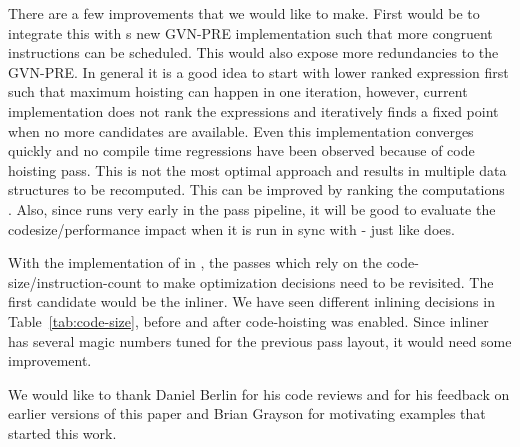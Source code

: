 \documentclass[acmlarge,review,anonymous]{acmart}\settopmatter{printfolios=true}
\begin{document}
There are a few improvements that we would like to make. First would be to
integrate this with s new GVN-PRE implementation such that more
congruent instructions can be scheduled. This would also expose more
redundancies to the GVN-PRE.  In general it is a good idea to start with lower
ranked expression first such that maximum hoisting can happen in one iteration,
however, current implementation does not rank the expressions and iteratively
finds a fixed point when no more candidates are available. Even this
implementation converges quickly and no compile time regressions have been
observed because of code hoisting pass. This is not the most optimal approach
and results in multiple data structures to be recomputed. This can be improved
by ranking the computations \cite{rosen1988global}. Also, since \GCM{} runs very
early in the pass pipeline, it will be good to evaluate the codesize/performance
impact when it is run in sync with \GVN{}-\PRE{} just like \GCC{} does.

With the implementation of \GCM{} in \LLVM{}, the passes which rely on the
code-size/instruction-count to make optimization decisions need to be
revisited. The first candidate would be the inliner. We have seen different
inlining decisions in Table~\ref{tab:code-size}, before and after code-hoisting
was enabled.  Since inliner has several magic numbers tuned for the previous
pass layout, it would need some improvement.

\begin{acks}                            %
We would like to thank Daniel Berlin for his code reviews and for his feedback
on earlier versions of this paper and Brian Grayson for motivating examples that
started this work.
\end{acks}




\end{document}
